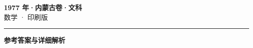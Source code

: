 \documentclass[zihao=5, a4paper]{ctexart}
\begin{document}
\begin{center}
  {\Large\bfseries 1977 年·内蒙古卷·文科}\\[4pt]
  {\large 数学 · 印刷版}
\end{center}
\medskip
{}

\par\bigskip\hrule\bigskip
{}
\begin{center}{\large\bfseries 参考答案与详细解析}\end{center}
\smallskip

\end{document}
